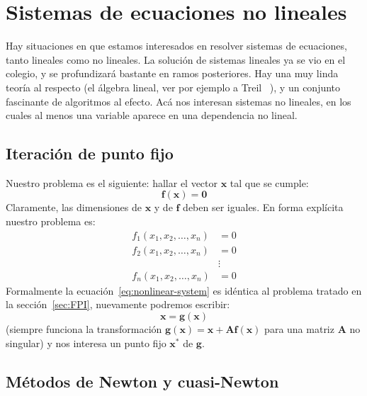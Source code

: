 

\chapter{Sistemas de ecuaciones no lineales}
\label{cha:sistemas-ecuaciones}

  Hay situaciones en que estamos interesados
  en resolver sistemas de ecuaciones,
  tanto lineales como no lineales.
  La solución de sistemas lineales ya se vio en el colegio,
  y se profundizará bastante en ramos posteriores.
  Hay una muy linda teoría al respecto
  (el álgebra lineal,
   ver por ejemplo a Treil~%
     \cite{treil17:_linear_algeb_done_wrong}),
  y un conjunto fascinante de algoritmos al efecto.
  Acá nos interesan sistemas no lineales,
  en los cuales al menos una variable aparece en una dependencia no lineal.

\section{Iteración de punto fijo}
\label{sec:FPI-multiple}

  Nuestro problema es el siguiente:
  hallar el vector \(\mathbf{x}\) tal que se cumple:
  \begin{equation}
    \label{eq:nonlinear-system}
    \mathbf{f}(\mathbf{x})
      = \mathbf{0}
  \end{equation}
  Claramente,
  las dimensiones de \(\mathbf{x}\) y de \(\mathbf{f}\)
  deben ser iguales.
  En forma explícita nuestro problema es:
  \begin{align*}
      f_1(x_1, x_2, \dotsc, x_n)
        &= 0 \\
      f_2(x_1, x_2, \dotsc, x_n)
        &= 0 \\
        &\vdots \\
      f_n(x_1, x_2, \dotsc, x_n)
        &= 0
  \end{align*}
  Formalmente la ecuación~\eqref{eq:nonlinear-system}
  es idéntica al problema tratado en la sección~\ref{sec:FPI},
  nuevamente podremos escribir:
  \begin{equation*}
    \mathbf{x}
      = \mathbf{g}(\mathbf{x})
  \end{equation*}
  (siempre funciona la transformación
    \(\mathbf{g}(\mathbf{x})
         = \mathbf{x} + \mathbf{A}\mathbf{f}(\mathbf{x})\)
   para una matriz \(\mathbf{A}\) no singular)
  y nos interesa un punto fijo \(\mathbf{x^*}\) de \(\mathbf{g}\).

\section{Métodos de Newton y cuasi-Newton}
\label{sec:cuasi-Newton}

